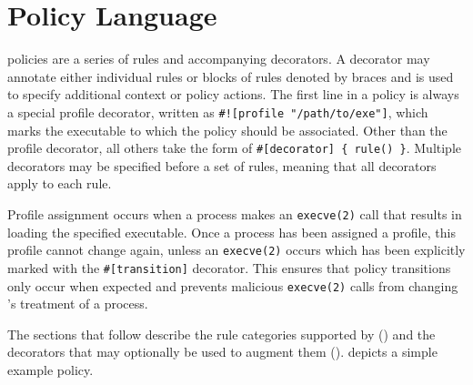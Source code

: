 \section{\bpfbox{} Policy Language}%
\label{s:bpfbox-policies}

\bpfbox{} policies are a series of rules and accompanying decorators. A decorator may
annotate either individual rules or blocks of rules denoted by braces and is used to
specify additional context or policy actions. The first line in a \bpfbox{} policy is
always a special profile decorator, written as \lstinline[language=bpfbox]{#![profile "/path/to/exe"]},
which marks the executable to which the policy should be associated.
Other than the profile decorator, all others take the form of
\lstinline[language=bpfbox]|#[decorator] { rule() }|. Multiple decorators may be specified
before a set of rules, meaning that all decorators apply to each rule.

Profile assignment occurs when a process makes an \texttt{execve(2)} call that results in
loading the specified executable.  Once a process has been assigned a profile, this
profile cannot change again, unless an \texttt{execve(2)} occurs which has been explicitly
marked with the \lstinline[language=bpfbox]{#[transition]} decorator. This ensures that
policy transitions only occur when expected and prevents malicious \texttt{execve(2)}
calls from changing \bpfbox{}'s treatment of a process.

The sections that follow describe the rule categories supported by \bpfbox{}
() and the decorators that
may optionally be used to augment them ().
 depicts a simple example \bpfbox{} policy.

